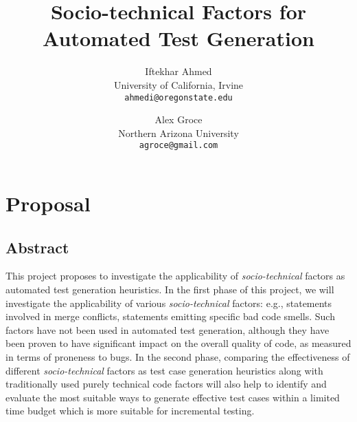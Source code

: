 \documentclass[10pt]{article}
\title{Socio-technical Factors for Automated Test Generation \vspace{-1ex}}
\author{
  Iftekhar Ahmed\\
  University of California, Irvine\\
  \texttt{ahmedi@oregonstate.edu} \vspace{-4ex}
  \and
  Alex Groce\\
  Northern Arizona University\\
  \texttt{agroce@gmail.com}
  \vspace{-4ex}
}
\date{}
\begin{document}
\maketitle

\section{Proposal}

\subsection{Abstract}

This project proposes to investigate the applicability of \emph{socio-technical} factors as automated test generation heuristics. In the first phase of this project, we will investigate the applicability of various \emph{socio-technical} factors: e.g., statements involved in merge conflicts, statements emitting specific bad code smells.   Such factors have not been used in automated test generation, although they have been proven to have significant impact on the overall quality of code, as measured in terms of proneness to bugs. In the second phase, comparing the effectiveness of different \emph{socio-technical} factors as test case generation heuristics along with traditionally used purely technical code factors will also help to identify and evaluate the most suitable ways to generate effective test cases within a limited time budget which is more suitable for incremental testing.


\end{document}
